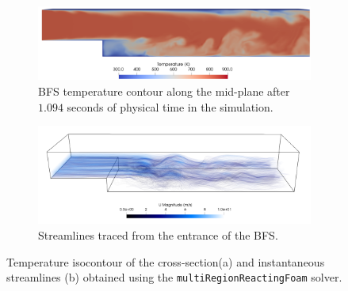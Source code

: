 \begin{figure}
  \begin{subfigure}{1\textwidth}
  \includegraphics[width=\linewidth]{figures/ch4/BFS_temperature.png}
  \caption{BFS temperature contour along the mid-plane after $1.094$ seconds of physical time in the simulation. }
  \label{fig:BFS_temperature}
  \end{subfigure}
  \begin{subfigure}{1\textwidth}
  \includegraphics[width=\linewidth]{figures/ch4/BFS_streamlines6.png}
  \caption{Streamlines traced from the entrance of the BFS.}
  \label{fig:BFS_streamlines}
  \end{subfigure}
  \caption{Temperature isocontour of the cross-section(a) and instantaneous streamlines (b) obtained using the \texttt{multiRegionReactingFoam} solver.}
  \label{fig:BFS_contours}
\end{figure}


